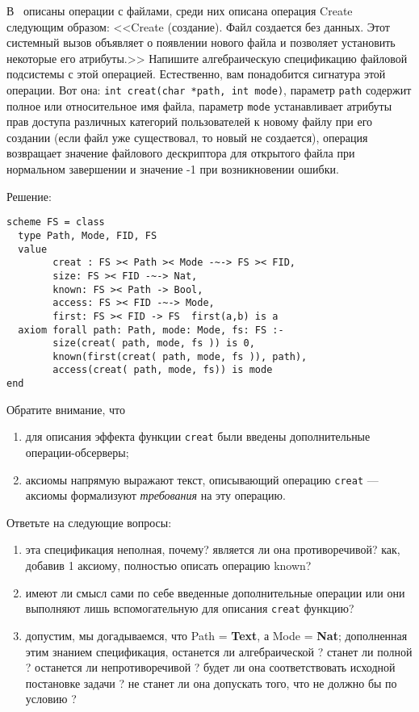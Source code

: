 
\z В~\cite{tanenbaum_os} описаны операции с файлами, среди них описана операция Create следующим образом: <<\textsf{Create} (создание). Файл создается без данных. Этот системный вызов объявляет о появлении нового файла и позволяет установить некоторые его атрибуты.>> Напишите алгебраическую спецификацию файловой подсистемы с этой операцией. Естественно, вам понадобится сигнатура этой операции. Вот она:  \texttt{int creat(char *path, int mode)}, параметр \texttt{path} содержит полное или относительное имя файла, параметр \texttt{mode} устанавливает атрибуты прав доступа различных категорий пользователей к новому файлу при его создании (если файл уже существовал, то новый не создается), операция возвращает значение файлового дескриптора для открытого файла при нормальном завершении и значение -1 при возникновении ошибки.

Решение:
\begin{lstlisting}
scheme FS = class
  type Path, Mode, FID, FS
  value
        creat : FS >< Path >< Mode -~-> FS >< FID,
        size: FS >< FID -~-> Nat,
        known: FS >< Path -> Bool,
        access: FS >< FID -~-> Mode,
        first: FS >< FID -> FS  first(a,b) is a
  axiom forall path: Path, mode: Mode, fs: FS :-
        size(creat( path, mode, fs )) is 0,
        known(first(creat( path, mode, fs )), path),
        access(creat( path, mode, fs)) is mode
end
\end{lstlisting}
Обратите внимание, что
\begin{enumerate}
  \item для описания эффекта функции \texttt{creat} были введены дополнительные операции-обсерверы;
  \item аксиомы напрямую выражают текст, описывающий операцию \texttt{creat} --- аксиомы формализуют \emph{требования} на эту операцию.
\end{enumerate}
Ответьте на следующие вопросы:
\begin{enumerate}
  \item эта спецификация неполная, почему? является ли она противоречивой? как, добавив 1 аксиому, полностью описать операцию known?
  \item имеют ли смысл сами по себе введенные дополнительные операции или они выполняют лишь вспомогательную для описания \texttt{creat} функцию?
  \item допустим, мы догадываемся, что Path = \textbf{Text}, а Mode = \textbf{Nat}; дополненная этим знанием спецификация, останется ли алгебраической ? станет ли полной ? останется ли непротиворечивой ? будет ли она соответствовать исходной постановке задачи ? не станет ли она допускать того, что не должно бы по условию ?
\end{enumerate}

